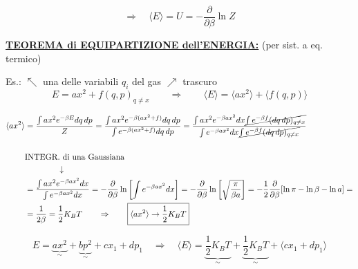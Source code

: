 \documentclass[12pt,a4paper]{article}
\begin{document}
\begin{equation*}
    \Rightarrow \quad \langle E \rangle = U = - \frac{\partial}{\partial \beta} \ln Z
\end{equation*}

\vspace{0.8cm}
\noindent \underline{\textbf{TEOREMA di EQUIPARTIZIONE dell'ENERGIA:}} (per sist. a eq. termico)

\vspace{0.3cm}
\noindent Es.: \qquad $\nwarrow$ una delle variabili $q_i$ del gas \hfill $\nearrow$ trascuro
\begin{equation*}
    E = a x^2 + f(q, p)_{q \neq x} \qquad \Rightarrow \qquad \langle E \rangle = \langle a x^2 \rangle + \langle f(q, p) \rangle
\end{equation*}

\begin{align*}
    \langle a x^2 \rangle &= \frac{\int a x^2 e^{-\beta E} dq \, dp}{Z} = \frac{\int a x^2 e^{-\beta(a x^2 + f)} dq \, dp}{\int e^{-\beta(a x^2 + f)} dq \, dp} = \frac{\int a x^2 e^{-\beta a x^2} dx \cancel{ \int e^{-\beta f} (dq \, dp)_{q \neq x} }}{\int e^{-\beta a x^2} dx \cancel{ \int e^{-\beta f} (dq \, dp)_{q \neq x} }} \\
    \\
    & \text{INTEGR. di una Gaussiana} \\
    & \qquad\qquad \downarrow \\
    &= \frac{\int a x^2 e^{-\beta a x^2} dx}{\int e^{-\beta a x^2} dx} = - \frac{\partial}{\partial \beta} \ln \left[ \int e^{-\beta a x^2} dx \right] = - \frac{\partial}{\partial \beta} \ln \left[ \sqrt{\frac{\pi}{\beta a}} \right] = - \frac{1}{2} \frac{\partial}{\partial \beta} [\ln \pi - \ln \beta - \ln a] = \\
    &= \frac{1}{2\beta} = \frac{1}{2} K_B T \qquad \Rightarrow \qquad \boxed{ \langle a x^2 \rangle \rightarrow \frac{1}{2} K_B T }
\end{align*}

\vspace{0.5cm}
\begin{equation*}
    E = \underbrace{ax^2}_{\sim} + \underbrace{bp^2}_{\sim} + cx_1 + dp_1 \quad \Rightarrow \quad \langle E \rangle = \underbrace{ \frac{1}{2} K_B T }_{\sim} + \underbrace{ \frac{1}{2} K_B T }_{\sim} + \langle cx_1 + dp_1 \rangle
\end{equation*}

\newpage
\end{document}
